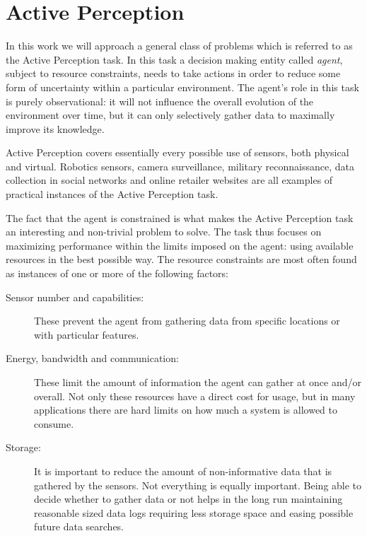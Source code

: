 \section{Active Perception}

In this work we will  approach a general class of problems which is referred to as the Active
Perception task. In this task a decision making entity called \textit{agent}, subject to resource
constraints, needs to take actions in order to reduce some form of uncertainty  within a particular
environment. The agent's role in this task is purely observational: it will not influence the
overall evolution of the environment over time, but it can only selectively gather data to maximally
improve its knowledge. 

Active Perception covers essentially every possible use of sensors, both physical and virtual. 
Robotics sensors, camera surveillance, military reconnaissance, data collection in social networks
and online retailer websites are all examples of practical instances of the Active Perception task.

The fact that the agent is constrained is what makes the Active Perception task an interesting and
non-trivial problem to solve. The task thus focuses on maximizing performance within the limits
imposed on the agent: using available resources in the best possible way. The resource constraints
are most often found as instances of one or more of the following factors:

\begin{description}
\item[Sensor number and capabilities:] These prevent the agent from gathering data from specific
    locations or with particular features.
\item[Energy, bandwidth and communication:] These limit the amount of information the agent can
    gather at once and/or overall. Not only these resources have a direct cost for usage, but in
    many applications there are hard limits on how much a system is allowed to consume.
\item[Storage:] It is important to reduce the amount of non-informative data that is gathered by the
    sensors. Not everything is equally important. Being able to decide whether to gather data or not
    helps in the long run maintaining reasonable sized data logs requiring less storage space and
    easing possible future data searches.
\end{description}

